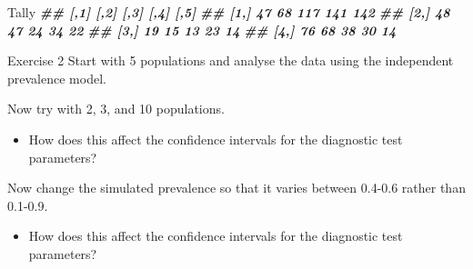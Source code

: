 \documentclass[
  ignorenonframetext,
]{beamer}
\newenvironment{Shaded}{\begin{snugshade}}{\end{snugshade}}
\newcommand{\DocumentationTok}[1]{\textcolor[rgb]{0.56,0.35,0.01}{\textbf{\textit{#1}}}}
\newcommand{\NormalTok}[1]{#1}
\providecommand{\tightlist}{%
  \setlength{\itemsep}{0pt}\setlength{\parskip}{0pt}}
\begin{document}
\begin{frame}[fragile]
\scriptsize

\begin{Shaded}
\begin{Highlighting}[]
\NormalTok{Tally}
\DocumentationTok{\#\#      [,1] [,2] [,3] [,4] [,5]}
\DocumentationTok{\#\# [1,]   47   68  117  141  142}
\DocumentationTok{\#\# [2,]   48   47   24   34   22}
\DocumentationTok{\#\# [3,]   19   15   13   23   14}
\DocumentationTok{\#\# [4,]   76   68   38   30   14}
\end{Highlighting}
\end{Shaded}

\normalsize
\end{frame}

\begin{frame}
\begin{block}{Exercise 2}
\protect\hypertarget{exercise-2}{}
Start with 5 populations and analyse the data using the independent
prevalence model.

Now try with 2, 3, and 10 populations.

\begin{itemize}
\tightlist
\item
  How does this affect the confidence intervals for the diagnostic test
  parameters?
\end{itemize}

Now change the simulated prevalence so that it varies between 0.4-0.6
rather than 0.1-0.9.

\begin{itemize}
\tightlist
\item
  How does this affect the confidence intervals for the diagnostic test
  parameters?
\end{itemize}
\end{block}
\end{frame}
\end{document}
